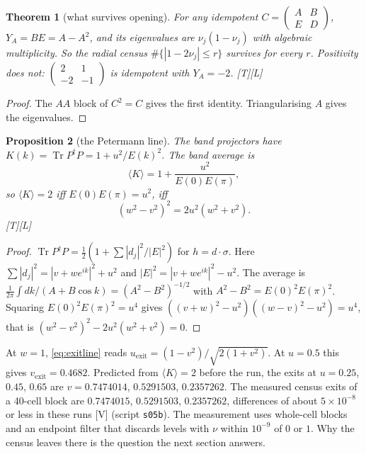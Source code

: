 \documentclass[11pt]{article}
\newtheorem{theorem}{Theorem}[section]
\newtheorem{proposition}[theorem]{Proposition}
\theoremstyle{definition}
\newcommand{\grade}[1]{\textsf{\small[#1]}}
\newcommand{\Tr}{\operatorname{Tr}}
\begin{document}
\begin{theorem}[what survives opening]\label{thm:open}
For any idempotent $C=\begin{pmatrix}A&B\\E&D\end{pmatrix}$, $Y_A=BE=A-A^2$, and its eigenvalues are $\nu_j(1-\nu_j)$ with algebraic multiplicity. So the radial census $\#\{|1-2\nu_j|\le r\}$ survives for every $r$. Positivity does not: $\begin{pmatrix}2&1\\-2&-1\end{pmatrix}$ is idempotent with $Y_A=-2$. \grade{T}\grade{L}
\end{theorem}
\begin{proof}
The $AA$ block of $C^2=C$ gives the first identity. Triangularising $A$ gives the eigenvalues.
\end{proof}

\begin{proposition}[the Petermann line]\label{prop:petermann}
The band projectors have $K(k)=\Tr P^\dagger P=1+u^2/E(k)^2$. The band average is
\[
\langle K\rangle=1+\frac{u^2}{E(0)E(\pi)},
\]
so $\langle K\rangle=2$ iff $E(0)E(\pi)=u^2$, iff
\begin{equation}\label{eq:exitline}
(w^2-v^2)^2=2u^2(w^2+v^2).
\end{equation}
\grade{T}\grade{L}
\end{proposition}
\begin{proof}
$\Tr P^\dagger P=\tfrac12(1+\sum|d_j|^2/|E|^2)$ for $h=d\cdot\sigma$. Here $\sum|d_j|^2=|v+we^{ik}|^2+u^2$ and $|E|^2=|v+we^{ik}|^2-u^2$. The average is $\frac1{2\pi}\int dk/(A+B\cos k)=(A^2-B^2)^{-1/2}$ with $A^2-B^2=E(0)^2E(\pi)^2$. Squaring $E(0)^2E(\pi)^2=u^4$ gives $((v+w)^2-u^2)((w-v)^2-u^2)=u^4$, that is $(w^2-v^2)^2-2u^2(w^2+v^2)=0$.
\end{proof}
At $w=1$, \eqref{eq:exitline} reads $u_{\mathrm{exit}}=(1-v^2)/\sqrt{2(1+v^2)}$. At $u=0.5$ this gives $v_{\mathrm{exit}}=0.4682$. Predicted from $\langle K\rangle=2$ before the run, the exits at $u=0.25$, $0.45$, $0.65$ are $v=0.7474014$, $0.5291503$, $0.2357262$. The measured census exits of a 40-cell block are $0.7474015$, $0.5291503$, $0.2357262$, differences of about $5\times10^{-8}$ or less in these runs \grade{V} (script \texttt{s05b}). The measurement uses whole-cell blocks and an endpoint filter that discards levels with $\nu$ within $10^{-9}$ of $0$ or $1$. Why the census leaves there is the question the next section answers.
\end{document}
